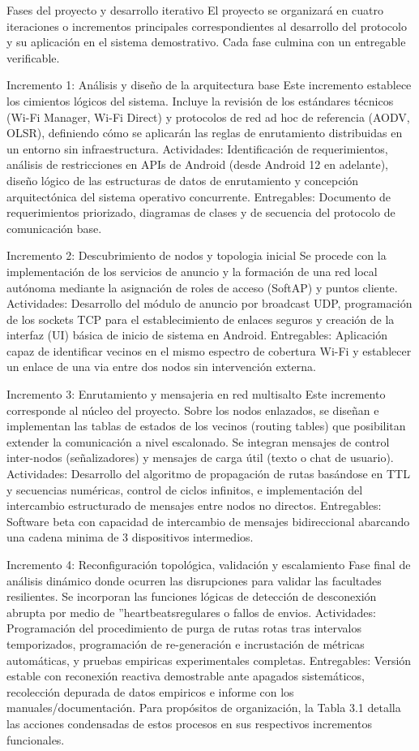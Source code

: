 Fases del proyecto y desarrollo iterativo El proyecto se organizará en cuatro iteraciones o incrementos principales correspondientes al desarrollo del protocolo y su aplicación en el sistema demostrativo. Cada fase culmina con un entregable verificable.

Incremento 1: Análisis y diseño de la arquitectura base Este incremento establece los cimientos lógicos del sistema. Incluye la revisión de los estándares técnicos (Wi-Fi Manager, Wi-Fi Direct) y protocolos de red ad hoc de referencia (AODV, OLSR), definiendo cómo se aplicarán las reglas de enrutamiento distribuidas en un entorno sin infraestructura. Actividades: Identificación de requerimientos, análisis de restricciones en APIs de Android (desde Android 12 en adelante), diseño lógico de las estructuras de datos de enrutamiento y concepción arquitectónica del sistema operativo concurrente. Entregables: Documento de requerimientos priorizado, diagramas de clases y de secuencia del protocolo de comunicación base.

Incremento 2: Descubrimiento de nodos y topologia inicial Se procede con la implementación de los servicios de anuncio y la formación de una red local autónoma mediante la asignación de roles de acceso (SoftAP) y puntos cliente. Actividades: Desarrollo del módulo de anuncio por broadcast UDP, programación de los sockets TCP para el establecimiento de enlaces seguros y creación de la interfaz (UI) básica de inicio de sistema en Android. Entregables: Aplicación capaz de identificar vecinos en el mismo espectro de cobertura Wi-Fi y establecer un enlace de una via entre dos nodos sin intervención externa.

Incremento 3: Enrutamiento y mensajeria en red multisalto Este incremento corresponde al núcleo del proyecto. Sobre los nodos enlazados, se diseñan e implementan las tablas de estados de los vecinos (routing tables) que posibilitan extender la comunicación a nivel escalonado. Se integran mensajes de control inter-nodos (señalizadores) y mensajes de carga útil (texto o chat de usuario). Actividades: Desarrollo del algoritmo de propagación de rutas basándose en TTL y secuencias numéricas, control de ciclos infinitos, e implementación del intercambio estructurado de mensajes entre nodos no directos. Entregables: Software beta con capacidad de intercambio de mensajes bidireccional abarcando una cadena minima de 3 dispositivos intermedios.

Incremento 4: Reconfiguración topológica, validación y escalamiento Fase final de análisis dinámico donde ocurren las disrupciones para validar las facultades resilientes. Se incorporan las funciones lógicas de detección de desconexión abrupta por medio de ”heartbeatsregulares o fallos de envios. Actividades: Programación del procedimiento de purga de rutas rotas tras intervalos temporizados, programación de re-generación e incrustación de métricas automáticas, y pruebas empiricas experimentales completas. Entregables: Versión estable con reconexión reactiva demostrable ante apagados sistemáticos, recolección depurada de datos empiricos e informe con los manuales/documentación. Para propósitos de organización, la Tabla 3.1 detalla las acciones condensadas de estos procesos en sus respectivos incrementos funcionales.

